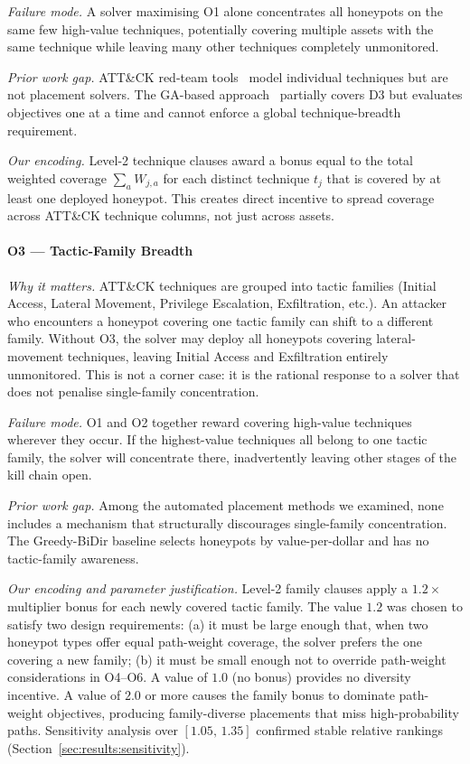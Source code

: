 \documentclass[journal]{IEEEtran}
\begin{document}
\textit{Failure mode.}
A solver maximising O1 alone concentrates all honeypots on the same
few high-value techniques, potentially covering multiple assets with
the same technique while leaving many other techniques completely
unmonitored.

\textit{Prior work gap.}
ATT\&CK red-team tools~\cite{applebaum2016} model individual
techniques but are not placement solvers. The GA-based
approach~\cite{hemberg2018} partially covers D3 but evaluates
objectives one at a time and cannot enforce a global technique-breadth
requirement.

\textit{Our encoding.}
Level-2 technique clauses award a bonus equal to the total weighted
coverage $\sum_a W_{j,a}$ for each distinct technique $t_j$ that is
covered by at least one deployed honeypot. This creates direct
incentive to spread coverage across ATT\&CK technique columns, not
just across assets.

\paragraph{O3 --- Tactic-Family Breadth}
\textit{Why it matters.}
ATT\&CK techniques are grouped into tactic families (Initial Access,
Lateral Movement, Privilege Escalation, Exfiltration, etc.). An
attacker who encounters a honeypot covering one tactic family can
shift to a different family. Without O3, the solver may deploy all
honeypots covering lateral-movement techniques, leaving Initial
Access and Exfiltration entirely unmonitored. This is not a corner
case: it is the rational response to a solver that does not penalise
single-family concentration.

\textit{Failure mode.}
O1 and O2 together reward covering high-value techniques wherever
they occur. If the highest-value techniques all belong to one tactic
family, the solver will concentrate there, inadvertently leaving
other stages of the kill chain open.

\textit{Prior work gap.}
Among the automated placement methods we examined, none includes a
mechanism that structurally discourages single-family concentration.
The Greedy-BiDir baseline selects honeypots by value-per-dollar and
has no tactic-family awareness.

\textit{Our encoding and parameter justification.}
Level-2 family clauses apply a $1.2\times$ multiplier bonus for
each newly covered tactic family. The value $1.2$ was chosen to
satisfy two design requirements: (a) it must be large enough that,
when two honeypot types offer equal path-weight coverage, the solver
prefers the one covering a new family; (b) it must be small enough
not to override path-weight considerations in O4--O6. A value of
$1.0$ (no bonus) provides no diversity incentive. A value of $2.0$
or more causes the family bonus to dominate path-weight objectives,
producing family-diverse placements that miss high-probability paths.
Sensitivity analysis over $[1.05,\,1.35]$ confirmed stable relative
rankings (Section~\ref{sec:results:sensitivity}).
\end{document}
